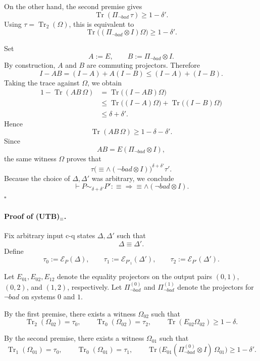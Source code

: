 \documentclass{report}
\theoremstyle{defn_style}
\begin{document}
On the other hand, the second premise gives
\[
\operatorname{Tr}(\Pi_{\neg bad}\,\tau)\ge 1-\delta'.
\]
Using $\tau=\operatorname{Tr}_2(\Omega)$, this is equivalent to
\[
\operatorname{Tr}\bigl((\Pi_{\neg bad}\otimes I)\Omega\bigr)\ge 1-\delta'.
\]

Set
\[
A:=E,
\qquad
B:=\Pi_{\neg bad}\otimes I.
\]
By construction, $A$ and $B$ are commuting projectors. Therefore
\[
I-AB=(I-A)+A(I-B)\le (I-A)+(I-B).
\]
Taking the trace against $\Omega$, we obtain
\begin{align*}
1-\operatorname{Tr}(AB\,\Omega)
&=
\operatorname{Tr}\bigl((I-AB)\Omega\bigr) \\
&\le
\operatorname{Tr}\bigl((I-A)\Omega\bigr)
+
\operatorname{Tr}\bigl((I-B)\Omega\bigr) \\
&\le
\delta+\delta'.
\end{align*}
Hence
\[
\operatorname{Tr}(AB\,\Omega)\ge 1-\delta-\delta'.
\]
Since
\[
AB = E(\Pi_{\neg bad}\otimes I),
\]
the same witness $\Omega$ proves that
\[
\tau \mathrel{\bigl(\equiv \wedge (\neg bad\otimes I)\bigr)^{\delta+\delta'}} \tau'.
\]
Because the choice of $\Delta,\Delta'$ was arbitrary, we conclude
\[
\vdash P \sim_{\delta+\delta'} P' : \equiv \Longrightarrow \equiv \wedge (\neg bad \otimes I).
\]
\hfill$\square$

\paragraph{Proof of \textsc{(UTB)}$_{\equiv}$.}
Fix arbitrary input c-q states $\Delta,\Delta'$ such that
\[
\Delta \mathrel{\equiv} \Delta'.
\]
Define
\[
\tau_0 := \mathcal{E}_{P}(\Delta),
\qquad
\tau_1 := \mathcal{E}_{P'_1}(\Delta'),
\qquad
\tau_2 := \mathcal{E}_{P'}(\Delta').
\]

Let $E_{01},E_{02},E_{12}$ denote the equality projectors on the output pairs
$(0,1)$, $(0,2)$, and $(1,2)$, respectively. Let
$\Pi_{\neg bad}^{(0)}$ and $\Pi_{\neg bad}^{(1)}$ denote the projectors for
$\neg bad$ on systems $0$ and $1$.

By the first premise, there exists a witness $\Omega_{02}$ such that
\[
\operatorname{Tr}_2(\Omega_{02})=\tau_0,
\qquad
\operatorname{Tr}_0(\Omega_{02})=\tau_2,
\qquad
\operatorname{Tr}(E_{02}\Omega_{02})\ge 1-\delta.
\]

By the second premise, there exists a witness $\Omega_{01}$ such that
\[
\operatorname{Tr}_1(\Omega_{01})=\tau_0,
\qquad
\operatorname{Tr}_0(\Omega_{01})=\tau_1,
\qquad
\operatorname{Tr}\bigl(E_{01}(\Pi_{\neg bad}^{(0)}\otimes I)\,\Omega_{01}\bigr)\ge 1-\delta'.
\]
\end{document}
